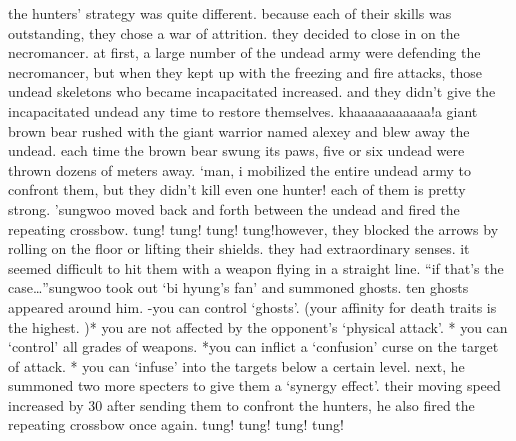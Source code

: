 the hunters’ strategy was quite different.
 because each of their skills was outstanding, they chose a war of attrition.
 they decided to close in on the necromancer.
at first, a large number of the undead army were defending the necromancer, but when they kept up with the freezing and fire attacks, those undead skeletons who became incapacitated increased.
 and they didn’t give the incapacitated undead any time to restore themselves.
khaaaaaaaaaaa!a giant brown bear rushed with the giant warrior named alexey and blew away the undead.
each time the brown bear swung its paws, five or six undead were thrown dozens of meters away.
‘man, i mobilized the entire undead army to confront them, but they didn’t kill even one hunter! each of them is pretty strong.
’sungwoo moved back and forth between the undead and fired the repeating crossbow.
tung! tung! tung! tung!however, they blocked the arrows by rolling on the floor or lifting their shields.
 they had extraordinary senses.
 it seemed difficult to hit them with a weapon flying in a straight line.
“if that’s the case…”sungwoo took out ‘bi hyung’s fan’ and summoned ghosts.
 ten ghosts appeared around him.
 -you can control ‘ghosts’.
 (your affinity for death traits is the highest.
)* you are not affected by the opponent’s ‘physical attack’.
* you can ‘control’ all grades of weapons.
*you can inflict a ‘confusion’ curse on the target of attack.
* you can ‘infuse’ into the targets below a certain level.
next, he summoned two more specters to give them a ‘synergy effect’.
their moving speed increased by 30%
 after sending them to confront the hunters, he also fired the repeating crossbow once again.
tung! tung! tung! tung!

 